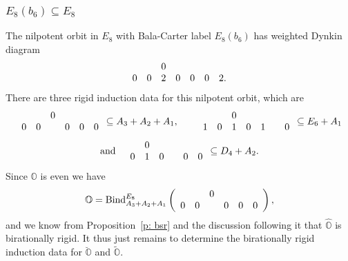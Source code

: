 \documentclass[11pt]{amsart}
\renewcommand{\O}{{\mathbb O}}
\newcommand{\BInd}{{{\mbox{\rm Bind}}}}
\newcommand{\covO}{\widetilde{\O}}
\newcommand{\hatO}{\widehat{\O}}
\newcommand{\breveO}{\breve{\O}}
\numberwithin{equation}{section}
\begin{document}
	
	\subsubsection{\texorpdfstring{$E_8(b_6)\subseteq E_8$}{E8b6 in E8}}\label{sss: E8b6 in E8}
	
	The nilpotent orbit in $E_8$ with Bala-Carter label $E_8(b_6)$ has weighted Dynkin diagram 
	$$\begin{array}{c c c c c c c}
		& & 0 & & & &  \\
		0 & 0 & 2 & 0 & 0 & 0 & 2. \\
	\end{array}$$
	There are three rigid induction data for this nilpotent orbit, which are $$\begin{array}{c c c c c c}
		& & 0 & & &  \\
		0 & 0 &  & 0 & 0 & 0  \\
	\end{array}\subseteq A_3+A_2+A_1,\quad \quad \begin{array}{c c c c c c c}
		& & 0 & & & &  \\
		1 & 0 & 1 & 0 & 1 & & 0  \\
	\end{array}\subseteq E_6+A_1$$ $$\mbox{and}\quad \begin{array}{c c c c c c}
		& 0 & & & & \\
		0 & 1 & 0 & & 0 & 0 \\
	\end{array}\subseteq D_4+A_2.$$
	Since $\O$ is even we have 
	$$\O=\BInd_{A_3 + A_2 +  A_1}^{E_8}\left(\begin{array}{c c c c c c}
		& & 0 & & &  \\
		0 & 0 &  & 0 & 0 & 0  \\
	\end{array}\right),$$
	and we know from Proposition~\ref{p: bsr} and the discussion following it that $\hatO$ is birationally rigid. It thus just remains to determine the birationally rigid induction data for $\breveO$ and $\covO$. 
	
\end{document}
